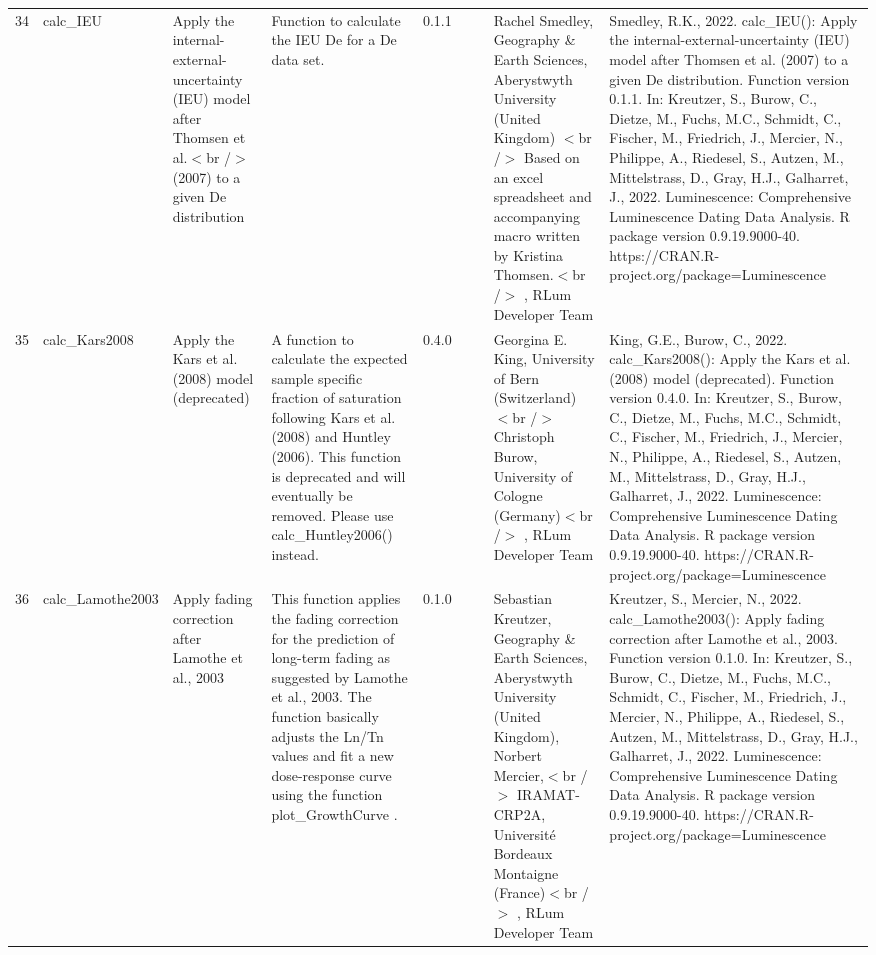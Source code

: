 \begin{table}[ht]
\begin{tabular}{rllllllll}
 \\ 
  34 & calc\_IEU & Apply the internal-external-uncertainty (IEU) model after Thomsen et al.$<$br /$>$ (2007) to a given De distribution & Function to calculate the IEU De for a De data set. & 0.1.1
 &  &  & Rachel Smedley, Geography \& Earth Sciences, Aberystwyth University (United Kingdom)  $<$br /$>$ Based on an excel spreadsheet and accompanying macro written by Kristina Thomsen.$<$br /$>$ , RLum Developer Team & Smedley, R.K., 2022. calc\_IEU(): Apply the internal-external-uncertainty (IEU) model after Thomsen et al. (2007) to a given De distribution. Function version 0.1.1. In: Kreutzer, S., Burow, C., Dietze, M., Fuchs, M.C., Schmidt, C., Fischer, M., Friedrich, J., Mercier, N., Philippe, A., Riedesel, S., Autzen, M., Mittelstrass, D., Gray, H.J., Galharret, J., 2022. Luminescence: Comprehensive Luminescence Dating Data Analysis. R package version 0.9.19.9000-40. https://CRAN.R-project.org/package=Luminescence
 \\ 
  35 & calc\_Kars2008 & Apply the Kars et al. (2008) model (deprecated) & A function to calculate the expected sample specific fraction of saturation following Kars et al. (2008) and Huntley (2006). This function is deprecated and will eventually be removed. Please use  calc\_Huntley2006()  instead. & 0.4.0
 &  &  & Georgina E. King, University of Bern (Switzerland)  $<$br /$>$ Christoph Burow, University of Cologne (Germany)$<$br /$>$ , RLum Developer Team & King, G.E., Burow, C., 2022. calc\_Kars2008(): Apply the Kars et al. (2008) model (deprecated). Function version 0.4.0. In: Kreutzer, S., Burow, C., Dietze, M., Fuchs, M.C., Schmidt, C., Fischer, M., Friedrich, J., Mercier, N., Philippe, A., Riedesel, S., Autzen, M., Mittelstrass, D., Gray, H.J., Galharret, J., 2022. Luminescence: Comprehensive Luminescence Dating Data Analysis. R package version 0.9.19.9000-40. https://CRAN.R-project.org/package=Luminescence
 \\ 
  36 & calc\_Lamothe2003 & Apply fading correction after Lamothe et al., 2003 & This function applies the fading correction for the prediction of long-term fading as suggested by Lamothe et al., 2003. The function basically adjusts the Ln/Tn values and fit a new dose-response curve using the function  plot\_GrowthCurve . & 0.1.0
 &  &  & Sebastian Kreutzer, Geography \& Earth Sciences, Aberystwyth University (United Kingdom), Norbert Mercier,$<$br /$>$ IRAMAT-CRP2A, Université Bordeaux Montaigne (France)$<$br /$>$ , RLum Developer Team & Kreutzer, S., Mercier, N., 2022. calc\_Lamothe2003(): Apply fading correction after Lamothe et al., 2003. Function version 0.1.0. In: Kreutzer, S., Burow, C., Dietze, M., Fuchs, M.C., Schmidt, C., Fischer, M., Friedrich, J., Mercier, N., Philippe, A., Riedesel, S., Autzen, M., Mittelstrass, D., Gray, H.J., Galharret, J., 2022. Luminescence: Comprehensive Luminescence Dating Data Analysis. R package version 0.9.19.9000-40. https://CRAN.R-project.org/package=Luminescence

\end{tabular}
\end{table}
